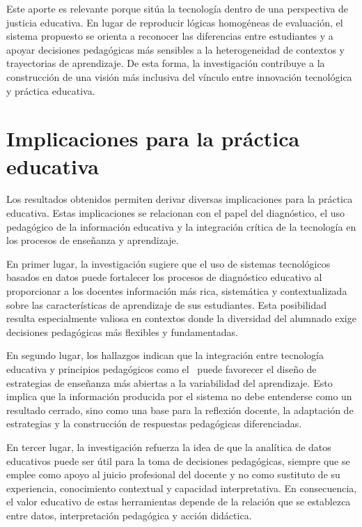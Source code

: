 \begin{refsection}
Este aporte es relevante porque sitúa la tecnología dentro de una perspectiva de justicia educativa. En lugar de reproducir lógicas homogéneas de evaluación, el sistema propuesto se orienta a reconocer las diferencias entre estudiantes y a apoyar decisiones pedagógicas más sensibles a la heterogeneidad de contextos y trayectorias de aprendizaje. De esta forma, la investigación contribuye a la construcción de una visión más inclusiva del vínculo entre innovación tecnológica y práctica educativa.

\section{Implicaciones para la práctica educativa}

Los resultados obtenidos permiten derivar diversas implicaciones para la práctica educativa. Estas implicaciones se relacionan con el papel del diagnóstico, el uso pedagógico de la información educativa y la integración crítica de la tecnología en los procesos de enseñanza y aprendizaje.

En primer lugar, la investigación sugiere que el uso de sistemas tecnológicos basados en datos puede fortalecer los procesos de diagnóstico educativo al proporcionar a los docentes información más rica, sistemática y contextualizada sobre las características de aprendizaje de sus estudiantes. Esta posibilidad resulta especialmente valiosa en contextos donde la diversidad del alumnado exige decisiones pedagógicas más flexibles y fundamentadas.

En segundo lugar, los hallazgos indican que la integración entre tecnología educativa y principios pedagógicos como el \DUA\ puede favorecer el diseño de estrategias de enseñanza más abiertas a la variabilidad del aprendizaje. Esto implica que la información producida por el sistema no debe entenderse como un resultado cerrado, sino como una base para la reflexión docente, la adaptación de estrategias y la construcción de respuestas pedagógicas diferenciadas.

En tercer lugar, la investigación refuerza la idea de que la analítica de datos educativos puede ser útil para la toma de decisiones pedagógicas, siempre que se emplee como apoyo al juicio profesional del docente y no como sustituto de su experiencia, conocimiento contextual y capacidad interpretativa. En consecuencia, el valor educativo de estas herramientas depende de la relación que se establezca entre datos, interpretación pedagógica y acción didáctica.


\end{refsection}
